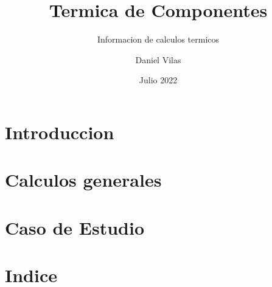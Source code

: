 \documentclass[spanish]{DccDiyTools/DccDiyTools}
\title{Termica de Componentes}
\subtitle{Informacion de calculos termicos}
\author{Daniel Vilas}
\date{Julio 2022}
\begin{document}
\maketitle
\newpage
\section{Introduccion}


\newpage
\section{Calculos generales}


\newpage
\section{Caso de Estudio}


\newpage
\section{Indice}
\tableofcontents

\listoffigures
\listoftables



\end{document}
